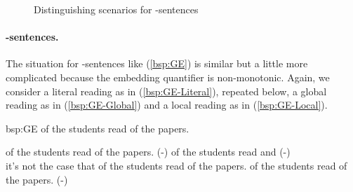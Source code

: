 \documentclass[fleqn,reqno,10pt,draft]{article}
\newcommand{\lit}{\acro{lit}}
\newcommand{\glb}{\acro{glb}}
\newcommand{\loc}{\acro{loc}}
\newcommand{\as}{\acro{as}}
\renewcommand{\es}{\acro{es}}
\begin{document}
\begin{figure}[]
{



}

  \caption{Distinguishing scenarios for \as-sentences}
  \label{fig:AS-distinguishing-pics}
\end{figure}


\paragraph{\es-sentences.}

The situation for \es-sentences like (\ref{bsp:GE}) is similar but a
little more complicated because the embedding quantifier is
non-monotonic. Again, we consider a literal reading as in
(\ref{bsp:GE-Literal}), repeated below, a global reading as in
(\ref{bsp:GE-Global}) and a local reading as in (\ref{bsp:GE-Local}).

\begin{exer}{bsp:GE}
\ex {} of the students read {} of the
  papers.

  \begin{xlist}
  \ex {} of the students read
    {} of the papers. \hfill (\es-\lit)
  \ex 
     of the students read  
    and  \hfill (\es-\glb)\\
    it's not the case that  of the students read  of the papers.
  \ex 
     of the students read {} of the
    papers. \hfill (\es-\loc)
  \end{xlist}
\end{exer}
\end{document}
